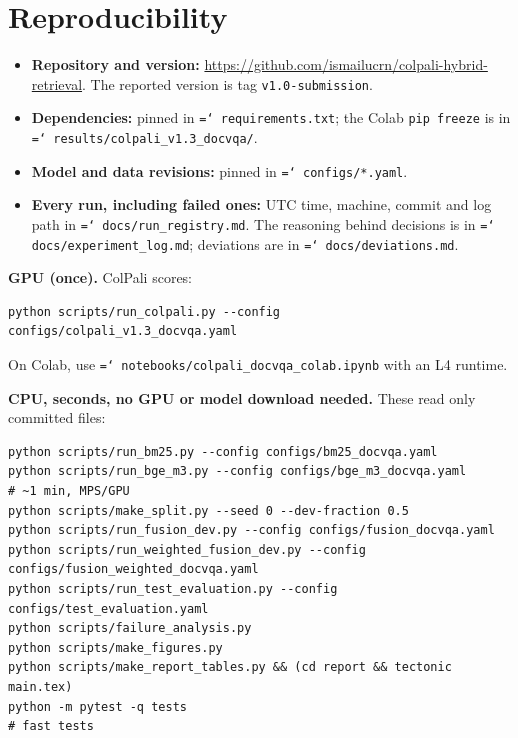 \documentclass[11pt,a4paper]{article}
\newcommand{\repo}{\url{https://github.com/ismailucrn/colpali-hybrid-retrieval}}
\newcommand{\file}[1]{\texttt{\small\hyphenchar\font=`\/ #1}}
\begin{document}
\appendix
\section{Reproducibility}
\label{app:repro}
\begin{itemize}
  \item \textbf{Repository and version:} \repo{}. The reported version is tag \texttt{v1.0-submission}.
  \item \textbf{Dependencies:} pinned in \file{requirements.txt}; the Colab \texttt{pip freeze} is in\\\file{results/colpali\_v1.3\_docvqa/}.
  \item \textbf{Model and data revisions:} pinned in \file{configs/*.yaml}.
  \item \textbf{Every run, including failed ones:} UTC time, machine, commit and log path in \file{docs/run\_registry.md}. The reasoning behind decisions is in \file{docs/experiment\_log.md}; deviations are in \file{docs/deviations.md}.
\end{itemize}

\noindent\textbf{GPU (once).} ColPali scores:
\begin{Verbatim}[fontsize=\footnotesize,breaklines=true]
python scripts/run_colpali.py --config configs/colpali_v1.3_docvqa.yaml
\end{Verbatim}
On Colab, use \file{notebooks/colpali\_docvqa\_colab.ipynb} with an L4 runtime.

\noindent\textbf{CPU, seconds, no GPU or model download needed.} These read only committed files:
\begin{Verbatim}[fontsize=\footnotesize,breaklines=true]
python scripts/run_bm25.py --config configs/bm25_docvqa.yaml
python scripts/run_bge_m3.py --config configs/bge_m3_docvqa.yaml      # ~1 min, MPS/GPU
python scripts/make_split.py --seed 0 --dev-fraction 0.5
python scripts/run_fusion_dev.py --config configs/fusion_docvqa.yaml
python scripts/run_weighted_fusion_dev.py --config configs/fusion_weighted_docvqa.yaml
python scripts/run_test_evaluation.py --config configs/test_evaluation.yaml
python scripts/failure_analysis.py
python scripts/make_figures.py
python scripts/make_report_tables.py && (cd report && tectonic main.tex)
python -m pytest -q tests                                             # fast tests
\end{Verbatim}
\end{document}
